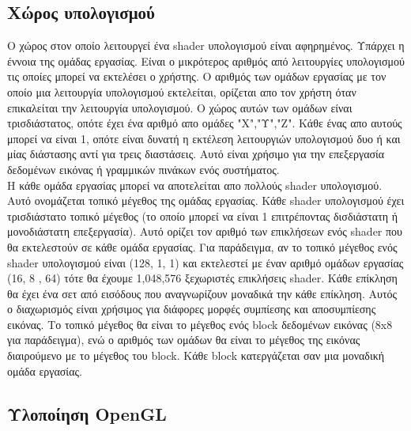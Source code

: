 \subsection{Χώρος υπολογισμού}
Ο χώρος στον οποίο λειτουργεί ένα shader υπολογισμού είναι αφηρημένος. Υπάρχει η έννοια της ομάδας εργασίας. Είναι ο μικρότερος αριθμός από λειτουργίες υπολογισμού τις οποίες μπορεί να εκτελέσει ο χρήστης.
Ο αριθμός των ομάδων εργασίας με τον οποίο μια λειτουργία υπολογισμού εκτελείται, ορίζεται απο τον χρήστη όταν επικαλείται την λειτουργία υπολογισμού. Ο χώρος αυτών των ομάδων είναι τρισδιάστατος, οπότε έχει ένα αριθμό απο ομάδες "Χ","Υ","Ζ". Κάθε ένας απο αυτούς μπορεί να είναι 1, οπότε είναι δυνατή η εκτέλεση λειτουργιών υπολογισμού δυο ή και μίας διάστασης αντί για τρεις διαστάσεις. Αυτό είναι χρήσιμο για την επεξεργασία δεδομένων εικόνας ή γραμμικών πινάκων ενός συστήματος.\\
Η κάθε ομάδα εργασίας μπορεί να αποτελείται απο πολλούς shader υπολογισμού. Αυτό ονομάζεται τοπικό μέγεθος της ομάδας εργασίας. Κάθε shader υπολογισμού έχει τρισδιάστατο τοπικό μέγεθος (το οποίο μπορεί να είναι 1 επιτρέποντας δισδιάστατη ή μονοδιάστατη επεξεργασία). Αυτό ορίζει τον αριθμό των επικλήσεων ενός shader που θα εκτελεστούν σε κάθε ομάδα εργασίας. Για παράδειγμα, αν το τοπικό μέγεθος ενός shader υπολογισμού είναι (128, 1, 1) και εκτελεστεί με έναν αριθμό ομάδων εργασίας (16, 8 , 64) τότε θα έχουμε 1,048,576 ξεχωριστές επικλήσεις shader. Κάθε επίκληση θα έχει ένα σετ από εισόδους που αναγνωρίζουν μοναδικά την κάθε επίκληση. Αυτός ο διαχωρισμός είναι χρήσιμος για διάφορες μορφές συμπίεσης και αποσυμπίεσης εικόνας. Το τοπικό μέγεθος θα είναι το μέγεθος ενός block δεδομένων εικόνας (8x8 για παράδειγμα), ενώ ο αριθμός των ομάδων θα είναι το μέγεθος της εικόνας διαιρούμενο με το μέγεθος του block. Κάθε block κατεργάζεται σαν μια μοναδική ομάδα εργασίας.
\subsection{Υλοποίηση OpenGL}
